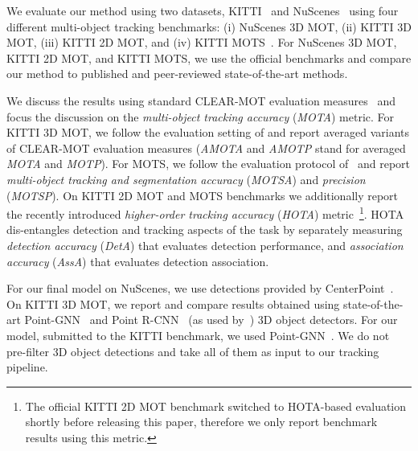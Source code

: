\documentclass[letterpaper, 10 pt, conference]{ieeeconf}
\makeatletter
\DeclareRobustCommand\onedot{\futurelet\@let@token\@onedot}
\def\@onedot{\ifx\@let@token.\else.\null\fi\xspace}
\def\eg{\emph{e.g}\onedot} \def\Eg{\emph{E.g}\onedot}
\newcommand{\PAR}[1]{\vskip4pt \noindent {\bf #1~}}
\makeatother
\begin{document}
\begin{table*}
\begin{center}
\begin{tabular}
\bottomrule

\end{tabular}
\end{center}
\vspace{-7pt}
\caption{Results on the 2D MOT KITTI benchmark. Note: reported methods use different object detectors, \eg our method uses the RRC~\cite{Ren17CVPR} detector for the \textit{car} class, same as MOTSFusion~\cite{luiten19arxiv} and BeyondPixels~\cite{Sharma18ICRA}.}


\label{tab:mot2d}
\end{table*}
% 
\label{sec:experimental}


We evaluate our method using two datasets, KITTI~\cite{Geiger12CVPR} and NuScenes~\cite{nuscenes2019} using four different multi-object tracking benchmarks: (i) NuScenes 3D MOT, (ii) KITTI 3D MOT, (iii) KITTI 2D MOT, and (iv) KITTI MOTS~\cite{Voigtlaender19CVPR}. 
For NuScenes 3D MOT, KITTI 2D MOT, and KITTI MOTS, we use the official benchmarks and compare our method to published and peer-reviewed state-of-the-art methods. 

\PAR{Evaluation measures.} We discuss the results using standard CLEAR-MOT evaluation measures~\cite{Bernardin08JIVP} and focus the discussion on the \textit{multi-object tracking accuracy} (\textit{MOTA}) metric. 
For KITTI 3D MOT, we follow the evaluation setting of \cite{Weng2020_AB3DMOT} and report averaged variants of CLEAR-MOT evaluation measures (\textit{AMOTA} and \textit{AMOTP} stand for averaged \textit{MOTA} and \textit{MOTP}).
For MOTS, we follow the evaluation protocol of~\cite{Voigtlaender19CVPR} and report \textit{multi-object tracking and segmentation accuracy} (\textit{MOTSA}) and \textit{precision} (\textit{MOTSP}). On KITTI 2D MOT and MOTS benchmarks we additionally report the recently introduced \textit{higher-order tracking accuracy} (\textit{HOTA}) metric~\cite{luiten20ijcv}\footnote{The official KITTI 2D MOT benchmark switched to HOTA-based evaluation shortly before releasing this paper, therefore we only report benchmark results using this metric.}. HOTA dis-entangles detection and tracking aspects of the task by separately measuring \textit{detection accuracy} (\textit{DetA}) that evaluates detection performance, and \textit{association accuracy} (\textit{AssA}) that evaluates detection association. 



\PAR{3D detections.} 
For our final model on NuScenes, we use detections provided by CenterPoint~\cite{yin2020center}. 
On KITTI 3D MOT, we report and compare results obtained using state-of-the-art Point-GNN~\cite{Point-GNN} and Point R-CNN~\cite{Shi19CVPR} (as used by~\cite{Weng2020_AB3DMOT}) 3D object detectors. 
For our model, submitted to the KITTI benchmark, we used Point-GNN~\cite{Point-GNN}.
We do not pre-filter 3D object detections and take all of them as input to our tracking pipeline.
\end{document}
